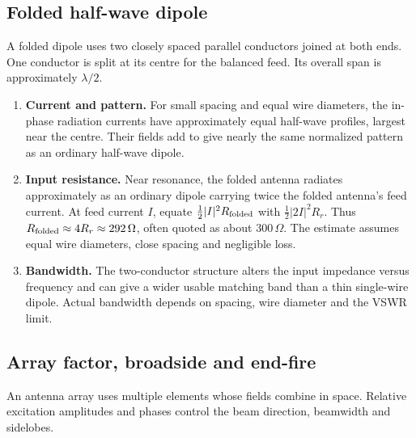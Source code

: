 \documentclass[12pt,a4paper]{article}
\begin{document}
\subsection{Folded half-wave dipole}
\begin{tcolorbox}[defbox,title={Folded dipole}]
A folded dipole uses two closely spaced parallel conductors joined at both ends. One conductor is split at its centre for the balanced feed. Its overall span is approximately $\lambda/2$.
\end{tcolorbox}
\begin{tcolorbox}[tikzbox,title={Folded dipole and its in-phase radiation currents},unbreakable]
\centering
{}
\end{tcolorbox}

\begin{enumerate}[leftmargin=*,itemsep=4pt]
\item \textbf{Current and pattern.} For small spacing and equal wire diameters, the in-phase radiation currents have approximately equal half-wave profiles, largest near the centre. Their fields add to give nearly the same normalized pattern as an ordinary half-wave dipole.
\item \textbf{Input resistance.} Near resonance, the folded antenna radiates approximately as an ordinary dipole carrying twice the folded antenna's feed current. At feed current $I$, equate $\tfrac12|I|^2R_{\rm folded}$ with $\tfrac12|2I|^2R_r$. Thus $R_{\rm folded}\approx4R_r\approx292\,\Omega$, often quoted as about $300\,\Omega$. The estimate assumes equal wire diameters, close spacing and negligible loss.
\item \textbf{Bandwidth.} The two-conductor structure alters the input impedance versus frequency and can give a wider usable matching band than a thin single-wire dipole. Actual bandwidth depends on spacing, wire diameter and the VSWR limit.
\end{enumerate}

\subsection{Array factor, broadside and end-fire}
\begin{tcolorbox}[defbox,title={Antenna array}]
An antenna array uses multiple elements whose fields combine in space. Relative excitation amplitudes and phases control the beam direction, beamwidth and sidelobes.
\end{tcolorbox}
\end{document}
